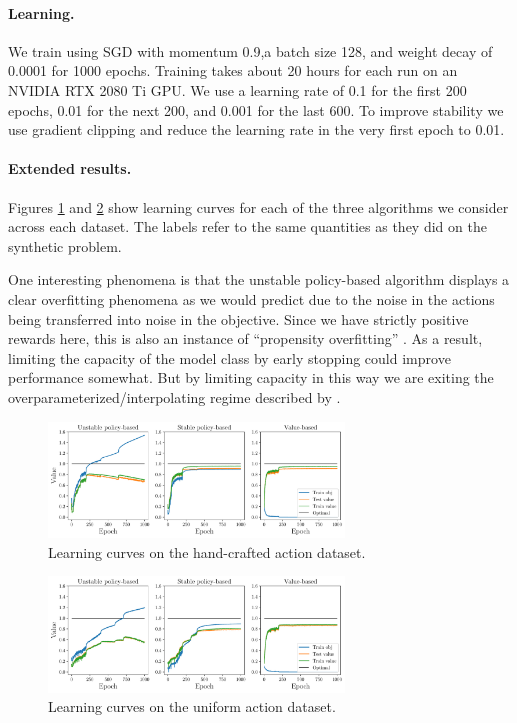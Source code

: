 \paragraph{Learning.} We train using SGD with momentum 0.9,a batch size 128, and weight decay of 0.0001 for 1000 epochs. Training takes about 20 hours for each run on an NVIDIA RTX 2080 Ti GPU. We use a learning rate of 0.1 for the first 200 epochs, 0.01 for the next 200, and 0.001 for the last 600. To improve stability we use gradient clipping and reduce the learning rate in the very first epoch to 0.01.

\paragraph{Extended results.}
Figures \ref{fig:cifar_learning_blbf} and \ref{fig:cifar_learning_uniform} show learning curves for each of the three algorithms we consider across each dataset. The labels refer to the same quantities as they did on the synthetic problem.

One interesting phenomena is that the unstable policy-based algorithm displays a clear overfitting phenomena as we would predict due to the noise in the actions being transferred into noise in the objective. Since we have strictly positive rewards here, this is also an instance of ``propensity overfitting'' \cite{swaminathan2015self}. As a result, limiting the capacity of the model class by early stopping could improve performance somewhat. But by limiting capacity in this way we are exiting the overparameterized/interpolating regime described by \citet{zhang2016understanding}.

\begin{figure}[h]
    \centering
    \includegraphics[width=0.7\textwidth]{figures/offline-bandits/cifar_learning_blbf.pdf}
    \caption{Learning curves on the hand-crafted action dataset.}
    \label{fig:cifar_learning_blbf}
\end{figure}


\begin{figure}[h]
    \centering
    \includegraphics[width=0.7\textwidth]{figures/offline-bandits/cifar_learning_uniform_0.pdf}
    \caption{Learning curves on the uniform action dataset.}
    \label{fig:cifar_learning_uniform}
\end{figure}



